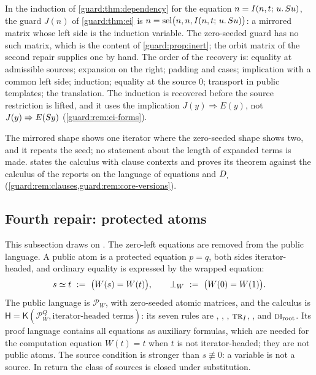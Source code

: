 In the induction of \cref{guard:thm:dependency} for the equation
$n=I(n,t;\,u.\,S u)$, the guard $J(n)$ of \cref{guard:thm:ei} is
$n=\operatorname{sel}\bigl(n,n,I(n,t;\,u.\,S u)\bigr)$: a mirrored matrix whose left
side is the induction variable.  The zero-seeded guard has no such matrix,
which is the content of \cref{guard:prop:inert}; the orbit matrix of the
second repair supplies one by hand.  The order of the recovery is: equality
at admissible sources; expansion on the right; padding and cases;
implication with a common left side; induction; equality at the source $0$;
transport in public templates; the translation.  The induction is recovered
before the source restriction is lifted, and it uses the implication
$J(y)\Rightarrow E(y)$, not $J(y)\Rightarrow E(S y)$
(\cref{guard:rem:ei-forms}).

\begin{remark}[Scope]
\label{guard:rem:mirror-scope}
The mirrored shape shows one iterator where the zero-seeded shape shows
two, and it repeats the seed; no statement about the length of expanded
terms is made.   states the calculus with clause contexts
and proves its theorem against the calculus of the reports on the language
of equations and $D_{,}$ (\cref{guard:rem:clauses,guard:rem:core-versions}).
\end{remark}

\subsection{Fourth repair: protected atoms}
\label{guard:sec:protected}

This subsection draws on .  The zero-left equations are
removed from the public language.  A public atom is a protected equation
$p=q$, both sides iterator-headed, and ordinary equality is expressed by
the wrapped equation:
\[
 s\simeq t\ \defeq\ \bigl(W(s)=W(t)\bigr),\qquad
 \bot_{W}\ \defeq\ \bigl(W(0)=W(1)\bigr).
\]
The public language is $\mathcal P_W$, with zero-seeded atomic matrices,
and the calculus is
$\mathsf H=\mathsf K(\mathcal P_W^{Q},\text{iterator-headed terms})$: its
seven rules are , , ,
$\rulename{Tr}_I$, ,  and
$\rulename{DI}_{\mathrm{root}}$.  Its proof language contains all
equations as auxiliary formulas, which are needed for the computation
equation $W(t)=t$ when $t$ is not iterator-headed; they are not public
atoms.  The source condition is stronger than $s\not\equiv 0$: a variable is
not a source.  In return the class of sources is closed under substitution.

